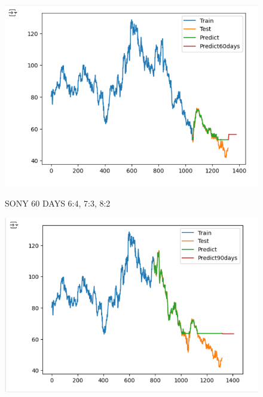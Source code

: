 \documentclass{article}
\begin{document}
\begin{multicols}{2}
\begin{figure}[H]
\begin{minipage}{0.15\textwidth}
    \label{fig:2}
    \end{minipage}%
    \begin{minipage}{0.15\textwidth}
    \centering
    \includegraphics[width=1\textwidth]{Image/GradientBoosting/SONY_60_8_2_GradientBoostingRegressor.png}

    \label{fig:3}
    \end{minipage}
    \caption{SONY 60 DAYS  6:4, 7:3, 8:2 }
\end{figure}


\begin{figure}[H]
    \centering
    \begin{minipage}{0.15\textwidth}
    \centering
    \includegraphics[width=1\textwidth]{Image/GradientBoosting/SONY_90_6_4_GradientBoostingRegressor.png}
   

\end{minipage}
\end{figure}
\end{multicols}
\end{document}
